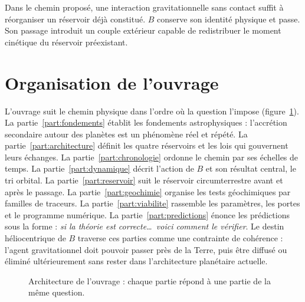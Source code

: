 \documentclass[11pt,a4paper,openany]{report}
\newcommand{\RD}{\mathcal{R}_{D}}
\begin{document}
\begin{lecture}
Dans le chemin proposé, une interaction gravitationnelle sans contact suffit à réorganiser un
réservoir déjà constitué. $B$ conserve son identité physique et passe. Son passage introduit un
couple extérieur capable de redistribuer le moment cinétique du réservoir préexistant.
\end{lecture}


\section{Organisation de l'ouvrage}

L'ouvrage suit le chemin physique dans l'ordre où la question l'impose
(figure~\ref{fig:plan}). La partie~\ref{part:fondements} établit les fondements astrophysiques :
l'accrétion secondaire autour des planètes est un phénomène réel et répété. La
partie~\ref{part:architecture} définit les quatre réservoirs et les lois qui gouvernent leurs
échanges. La partie~\ref{part:chronologie} ordonne le chemin par ses échelles de temps. La
partie~\ref{part:dynamique} décrit l'action de $B$ et son résultat central, le tri orbital. La
partie~\ref{part:reservoir} suit le réservoir circumterrestre avant et après le passage. La
partie~\ref{part:geochimie} organise les tests géochimiques par familles de traceurs. La
partie~\ref{part:viabilite} rassemble les paramètres, les portes et le programme numérique. La
partie~\ref{part:predictions} énonce les prédictions sous la forme : \emph{si la théorie est
correcte\dots\ voici comment le vérifier}.
Le destin héliocentrique de $B$ traverse ces parties comme une contrainte de cohérence : l'agent
gravitationnel doit pouvoir passer près de la Terre, puis être diffusé ou éliminé ultérieurement
sans rester dans l'architecture planétaire actuelle.

\begin{figure}[htbp]
\centering
{}
\caption{Architecture de l'ouvrage : chaque partie répond à une partie de la même question.}
\label{fig:plan}
\end{figure}
\end{document}
